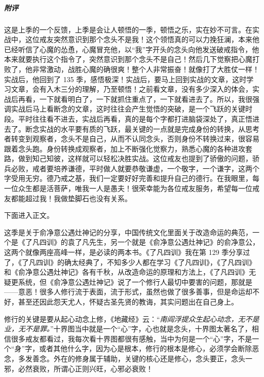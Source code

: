 \begin{case}
    \subparagraph{附评} 这是上季的一个反馈，上季是会让人顿悟的一季，顿悟之乐，实在妙不可言。在实战中，这位戒友突然意识到那个念头不是我！这个领悟真的可以力挽狂澜，本来他已经听信了心魔的怂恿，心魔冒充他，以“我”字开头的念头向他发送破戒指令，他本来就要执行这个指令了，突然意识到那个念头不是自己！然后几下觉察把心魔打败了，他非常激动，战胜心魔的确很爽！整个人非常振奋！就像打了大胜仗一样！实战后，他回到了 135 季，感悟极深！实战后，要马上回到实战的文章，这时学习文章，会有入木三分的理解，乃至顿悟！之前看文章，没有多少深入的体会，实战后再看，一下就看明白了，一下就抓住重点了，一下就看进去了。所以，我很强调实战后马上看断念的文章，这时往往会产生觉悟的突破，是一个飞跃的关键时段。平时往往看不进去，实战后再看，真的是每个字都打进脑袋深处了，真正悟进去了。断念实战的水平要有质的飞跃，最关键的一点就是完成身份的转换，从思考者转变到观察者，念头不是自己，从而不认同念头，否则身份不转换过来，很容易跟着念头跑。身份转换成观察者，加上不断强化觉察力，熟悉心魔的各种进攻套路，做到知己知彼，这样就可以轻松决胜实战。这位戒友也提到了骄傲的问题，骄兵必败，戒者要培养谦德，平时做人就要恭敬谦虚，一个敬字，一个谦字，这两个字受用无穷。德乃戒之基，我们一定要好好完善和提升自己的德行。在我眼里，每一位众生都是活菩萨，唯我一人是愚夫！很荣幸能为各位戒友服务，希望每一位戒友都能超过我！我做垫脚石也没有关系。
\end{case}

下面进入正文。

这季是关于俞净意公遇灶神记的分享，中国传统文化里面关于改造命运的典范，一个是《了凡四训》的袁了凡先生，另一个就是《俞净意公遇灶神记》的俞净意公，这两个就像两座高峰一样，是必读的两本书。《了凡四训》我在第 129 季分享过了，《了凡四训》的确太经典了，不知多少人都在学习《了凡四训》，《了凡四训》和《俞净意公遇灶神记》各有千秋，从改造命运的原理和方法上，《了凡四训》无疑更系统，但《俞净意公遇灶神记》说了一个修行人最切中要害的问题，那就是——意恶！很多人修行流于表面，流于形式，虽然也做了很多善事，但是命运却不好，甚至还因此怨天尤人，怀疑古圣先贤的教诲，其实问题出在自己身上。

修行的关键是要从起心动念上修，《地藏经》云：“\textit{南阎浮提众生起心动念，无不是业，无不是罪。}”十界图当中就是一个“心”字，心也就是念头，十界图太著名了，相信很多戒友都看过，我每次看十界图都很有感触，当中为何是一个“心”字，不是一个“身”字，或者其他什么字，因为心是根本，修行的根本是修心，必须学会断除恶念，多发善念。外在的修身属于辅助，关键的核心还是修心，念头要正，念头一邪，必然衰败，所谓心正则兴旺，心邪必衰败！

